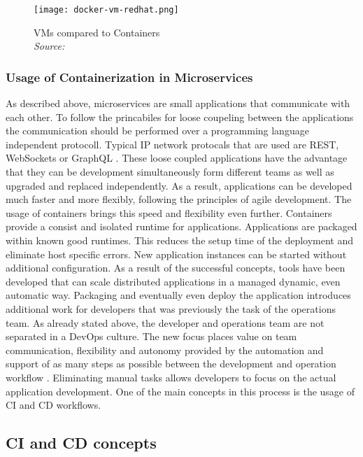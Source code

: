 \documentclass[12pt, a4paper]{article}
\begin{document}
        \begin{figure}
            \centering
            \texttt{[image: docker-vm-redhat.png]}
            \caption{\ac{VM}s compared to Containers \\\textit{Source:~\cite{redhat_pic}}}\label{fig::vm_docker}
        \end{figure}

        \subsubsection{Usage of Containerization in Microservices}
        As described above, microservices are small applications that communicate with each other. To follow the princabiles for loose coupeling between the applications the communication should be performed over a programming language independent protocoll. Typical \acs{IP} network protocals that are used are \ac{REST}, WebSockets or GraphQL \cite{micro}. These loose coupled applications have the advantage that they can be development simultaneously form different teams as well as upgraded and replaced independently. As a result, applications can be developed much faster and more flexibly, following the principles of agile development.\newline
        The usage of containers brings this speed and flexibility even further. Containers provide a consist and isolated runtime for applications. Applications are packaged within known good runtimes. This reduces the setup time of the deployment and eliminate host specific errors. New application instances can be started without additional configuration. As a result of the successful concepts, tools have been developed that can scale distributed applications in a managed dynamic, even automatic way.\newpage
        \noindent Packaging and eventually even deploy the application introduces additional work for developers that was previously the task of the operations team. As already stated above, the developer and operations team are not separated in a DevOps culture. The new focus places value on team communication, flexibility and autonomy provided by the automation and support of as many steps as possible between the development and operation workflow \cite{effective_devops}. Eliminating manual tasks allows developers to focus on the actual application development. One of the main concepts in this process is the usage of \ac{CI} and \ac{CD} workflows.

    \subsection{\acl{CI} and \acl{CD} concepts}
\end{document}

